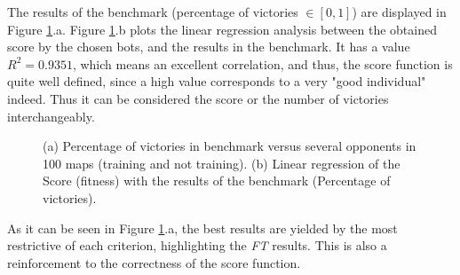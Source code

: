 \documentclass[runningheads,a4paper]{llncs}
\begin{document}
The results of the benchmark (percentage of victories $\in[0,1]$) are displayed in Figure \ref{fig:victories}.a. 
Figure \ref{fig:victories}.b plots the linear regression analysis between the obtained score by the chosen bots, and the results in the benchmark. It has a value $R^2=0.9351$, which means an excellent correlation, and thus, the score function is quite well defined, since a high value corresponds to a very "good individual" indeed. Thus it can be considered the score or the number of victories interchangeably.

\begin{figure}[h!tb]
\begin{center}
\end{center} 
\caption{(a) Percentage of victories in benchmark versus several opponents in 100 maps (training and not training). (b) Linear regression of the Score (fitness) with the results of the benchmark (Percentage of victories).} %
\label{fig:victories}
\end{figure}


As it can be seen in Figure \ref{fig:victories}.a, the best results are yielded by the most restrictive of each criterion, highlighting the \textit{FT} results. This is also a reinforcement to the correctness of the score function.
\end{document}
